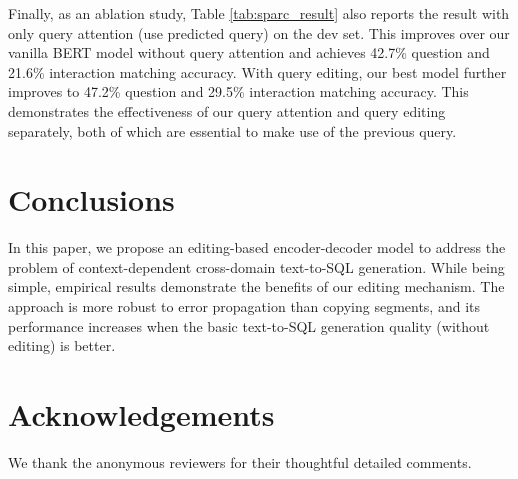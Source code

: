 \documentclass[11pt,a4paper]{article}
\begin{document}
Finally, as an ablation study, Table \ref{tab:sparc_result} also reports the result with only query attention (use predicted query) on the dev set.
This improves over our vanilla BERT model without query attention and achieves 42.7\% question and 21.6\% interaction matching accuracy.
With query editing, our best model further improves to 47.2\% question and 29.5\% interaction matching accuracy.
This demonstrates the effectiveness of our query attention and query editing separately, both of which are essential to make use of the previous query.

\vspace{-2mm}
\section{Conclusions}
\vspace{-2mm}
In this paper, we propose an editing-based encoder-decoder model to address the problem of context-dependent cross-domain text-to-SQL generation.
While being simple, empirical results demonstrate the benefits of our editing mechanism.
The approach is more robust to error propagation than copying segments, and its performance increases when the basic text-to-SQL generation quality (without editing) is better.


\section*{Acknowledgements}
We thank the anonymous reviewers for their thoughtful detailed comments.



\end{document}
